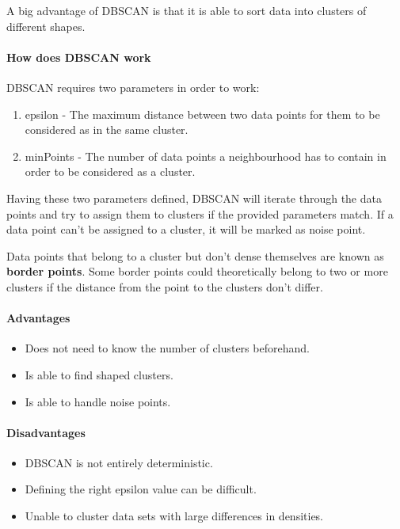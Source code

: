 A big advantage of DBSCAN is that it is able to sort data into clusters
of different shapes.

\paragraph{How does DBSCAN work}
DBSCAN requires two parameters in order to work:

\begin{enumerate}
    \item epsilon - The maximum distance between two data points for them to be considered as in the same cluster.
    \item minPoints - The number of data points a neighbourhood has to contain in order to be considered as a cluster.
\end{enumerate}

Having these two parameters defined, DBSCAN will iterate through the data points
and try to assign them to clusters if the provided parameters match.
If a data point can't be assigned to a cluster, it will be marked as noise point.

Data points that belong to a cluster but don't dense themselves are known as \textbf{border points}.
Some border points could theoretically belong to two or more clusters
if the distance from the point to the clusters don't differ.

\paragraph{Advantages}
\begin{itemize}
    \item Does not need to know the number of clusters beforehand.
    \item Is able to find shaped clusters.
    \item Is able to handle noise points.
\end{itemize}

\paragraph{Disadvantages}
\begin{itemize}
    \item DBSCAN is not entirely deterministic.
    \item Defining the right epsilon value can be difficult.
    \item Unable to cluster data sets with large differences in densities.
\end{itemize}

